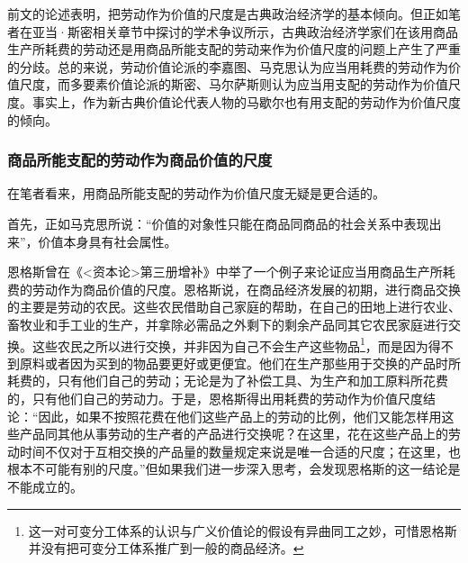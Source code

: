 前文的论述表明，把劳动作为价值的尺度是古典政治经济学的基本倾向。但正如笔者在亚当·斯密相关章节中探讨的学术争议所示，古典政治经济学家们在该用商品生产所耗费的劳动还是用商品所能支配的劳动来作为价值尺度的问题上产生了严重的分歧。总的来说，劳动价值论派的李嘉图、马克思认为应当用耗费的劳动作为价值尺度，而多要素价值论派的斯密、马尔萨斯则认为应当用支配的劳动作为价值尺度。事实上，作为新古典价值论代表人物的马歇尔也有用支配的劳动作为价值尺度的倾向\cite{perskyMarshallsNeoClassicalLaborValues1999}。

\subsubsection{商品所能支配的劳动作为商品价值的尺度}
在笔者看来，用商品所能支配的劳动作为价值尺度无疑是更合适的。

首先，正如马克思所说：“价值的对象性只能在商品同商品的社会关系中表现出来”\cite[61]{ZhongGongZhongYangMaKeSiEnGeSiLieNingSiDaLinZhuZuoBianYiJuMaKeSiEnGeSiWenJiDi5Juan2009}，价值本身具有社会属性。

恩格斯曾在《<资本论>第三册增补》中举了一个例子来论证应当用商品生产所耗费的劳动作为商品价值的尺度\cite[1015-1018]{ZhongGongZhongYangMaKeSiEnGeSiLieNingSiDaLinZhuZuoBianYiJuMaKeSiEnGeSiWenJiDi7Juan2009}。恩格斯说，在商品经济发展的初期，进行商品交换的主要是劳动的农民。这些农民借助自己家庭的帮助，在自己的田地上进行农业、畜牧业和手工业的生产，并拿除必需品之外剩下的剩余产品同其它农民家庭进行交换。这些农民之所以进行交换，并非因为自己不会生产这些物品\footnote{这一对可变分工体系的认识与广义价值论的假设有异曲同工之妙，可惜恩格斯并没有把可变分工体系推广到一般的商品经济。}，而是因为得不到原料或者因为买到的物品要更好或更便宜。他们在生产那些用于交换的产品时所耗费的，只有他们自己的劳动；无论是为了补偿工具、为生产和加工原料所花费的，只有他们自己的劳动力。于是，恩格斯得出用耗费的劳动作为价值尺度结论：“因此，如果不按照花费在他们这些产品上的劳动的比例，他们又能怎样用这些产品同其他从事劳动的生产者的产品进行交换呢？在这里，花在这些产品上的劳动时间不仅对于互相交换的产品量的数量规定来说是唯一合适的尺度；在这里，也根本不可能有别的尺度。”\cite[1016]{ZhongGongZhongYangMaKeSiEnGeSiLieNingSiDaLinZhuZuoBianYiJuMaKeSiEnGeSiWenJiDi7Juan2009}但如果我们进一步深入思考，会发现恩格斯的这一结论是不能成立的。

